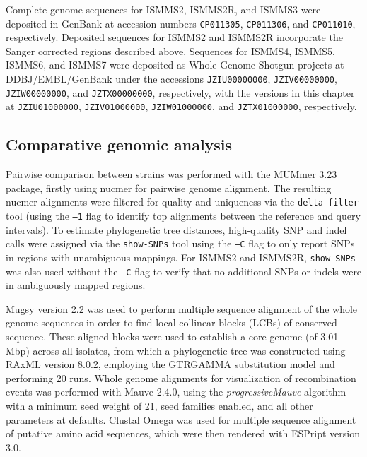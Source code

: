 Complete genome sequences for ISMMS2, ISMMS2R, and ISMMS3 were deposited in GenBank at accession numbers \texttt{CP011305}, \texttt{CP011306}, and \texttt{CP011010}, respectively. Deposited sequences for ISMMS2 and ISMMS2R incorporate the Sanger corrected regions described above. Sequences for ISMMS4, ISMMS5, ISMMS6, and ISMMS7 were deposited as Whole Genome Shotgun projects at DDBJ/EMBL/GenBank under the accessions \texttt{JZIU00000000}, \texttt{JZIV00000000}, \texttt{JZIW00000000}, and \texttt{JZTX00000000}, respectively, with the versions in this chapter at \texttt{JZIU01000000}, \texttt{JZIV01000000}, \texttt{JZIW01000000}, and \texttt{JZTX01000000}, respectively.

\subsection{Comparative genomic analysis}

Pairwise comparison between strains was performed with the MUMmer 3.23 package,\autocite{Delcher2003} firstly using nucmer for pairwise genome alignment. The resulting nucmer alignments were filtered for quality and uniqueness via the \texttt{delta-filter} tool (using the \texttt{–1} flag to identify top alignments between the reference and query intervals). To estimate phylogenetic tree distances, high-quality SNP and indel calls were assigned via the \texttt{show-SNPs} tool using the \texttt{–C} flag to only report SNPs in regions with unambiguous mappings. For ISMMS2 and ISMMS2R, \texttt{show-SNPs} was also used without the \texttt{–C} flag to verify that no additional SNPs or indels were in ambiguously mapped regions.

Mugsy version 2.2 was used to perform multiple sequence alignment of the whole genome sequences in order to find local collinear blocks (LCBs) of conserved sequence.\autocite{Angiuoli2011} These aligned blocks were used to establish a core genome (of 3.01 Mbp) across all isolates, from which a phylogenetic tree was constructed using RAxML version 8.0.2,\autocite{Stamatakis2014} employing the GTRGAMMA substitution model and performing 20 runs. Whole genome alignments for visualization of recombination events was performed with Mauve 2.4.0,\autocite{Darling2004} using the \emph{progressiveMauve} algorithm\autocite{Darling2010} with a minimum seed weight of 21, seed families enabled, and all other parameters at defaults. Clustal Omega\autocite{Sievers2011} was used for multiple sequence alignment of putative amino acid sequences, which were then rendered with ESPript version 3.0.\autocite{Robert2014}

